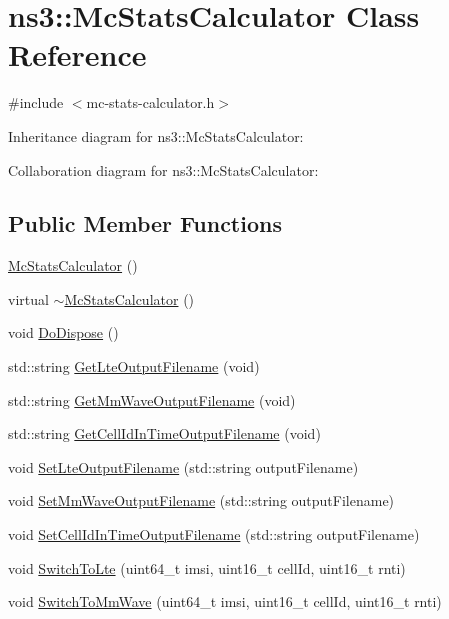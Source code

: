 \hypertarget{classns3_1_1McStatsCalculator}{}\section{ns3\+:\+:Mc\+Stats\+Calculator Class Reference}
\label{classns3_1_1McStatsCalculator}


{\ttfamily \#include $<$mc-\/stats-\/calculator.\+h$>$}



Inheritance diagram for ns3\+:\+:Mc\+Stats\+Calculator\+:


Collaboration diagram for ns3\+:\+:Mc\+Stats\+Calculator\+:
\subsection*{Public Member Functions}
\begin{DoxyCompactItemize}
\item 
\hyperlink{classns3_1_1McStatsCalculator_ae9aba8bc006d24ed29271c602140f50e}{Mc\+Stats\+Calculator} ()
\item 
virtual \hyperlink{classns3_1_1McStatsCalculator_a12890bcf616b8de76f92634510bee607}{$\sim$\+Mc\+Stats\+Calculator} ()
\item 
void \hyperlink{classns3_1_1McStatsCalculator_ab38aa4a8297308fdda314a6770541072}{Do\+Dispose} ()
\item 
std\+::string \hyperlink{classns3_1_1McStatsCalculator_a99914024c84b8048ba6c19902c32cce2}{Get\+Lte\+Output\+Filename} (void)
\item 
std\+::string \hyperlink{classns3_1_1McStatsCalculator_a039e2fb6fa488961a1983ce28a5aaaa1}{Get\+Mm\+Wave\+Output\+Filename} (void)
\item 
std\+::string \hyperlink{classns3_1_1McStatsCalculator_a05eae3b90cc1da20d8f5f552e7c17130}{Get\+Cell\+Id\+In\+Time\+Output\+Filename} (void)
\item 
void \hyperlink{classns3_1_1McStatsCalculator_a2d7f8aae72e78e6c90c49afa1adb102c}{Set\+Lte\+Output\+Filename} (std\+::string output\+Filename)
\item 
void \hyperlink{classns3_1_1McStatsCalculator_aa76ecda21201ce79f913166a4951e789}{Set\+Mm\+Wave\+Output\+Filename} (std\+::string output\+Filename)
\item 
void \hyperlink{classns3_1_1McStatsCalculator_a10b763f9107da0f69cec380a672b9697}{Set\+Cell\+Id\+In\+Time\+Output\+Filename} (std\+::string output\+Filename)
\item 
void \hyperlink{classns3_1_1McStatsCalculator_aece7c7caf980ab4511d7b40ca7df2192}{Switch\+To\+Lte} (uint64\+\_\+t imsi, uint16\+\_\+t cell\+Id, uint16\+\_\+t rnti)
\item 
void \hyperlink{classns3_1_1McStatsCalculator_a0991af48036bd5204b9179c7d8fa1874}{Switch\+To\+Mm\+Wave} (uint64\+\_\+t imsi, uint16\+\_\+t cell\+Id, uint16\+\_\+t rnti)
\end{DoxyCompactItemize}
